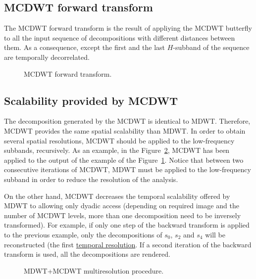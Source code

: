 \subsection{MCDWT forward transform}

The MCDWT forward transform is the result of appliying the MCDWT
butterfly to all the input sequence of decompositions with different
distances between them. As a consequence, except the first and the
last $H$-subband of the sequence are temporally decorrelated.

\begin{figure}
\centering
{}
\caption{MCDWT forward transform.\label{fig:forward_MCDWT}}
\end{figure}


\subsection{Scalability provided by MCDWT}
The decomposition generated by the MCDWT is identical to
MDWT. Therefore, MCDWT provides the same spatial scalability than
MDWT. In order to obtain several spatial resolutions, MCDWT should be
applied to the low-frequency subbands, recursively. As an example, in
the Figure~\ref{fig:multiresolution}, MCDWT has been applied to the
output of the example of the Figure~\ref{fig:forward_MCDWT}. Notice
that between two consecutive iterations of MCDWT, MDWT must be applied
to the low-frequency subband in order to reduce the resolution of the
analysis.

On the other hand, MCDWT decreases the temporal scalability offered by
MDWT to allowing only dyadic access (depending on required image and
the number of MCDWT levels, more than one decomposition need to be
inversely transformed). For example, if only one step of the backward
transform is applied to the previous example, only the decompositions
of $s_0$, $s_2$ and $s_4$ will be reconstructed (the first
\href{https://en.wikipedia.org/wiki/Temporal_resolution}{temporal
  resolution}. If a second iteration of the backward transform is
used, all the decompositions are rendered.

\begin{figure}
\centering
{}
\caption{MDWT+MCDWT multiresolution procedure.\label{fig:multiresolution}}
\end{figure}

